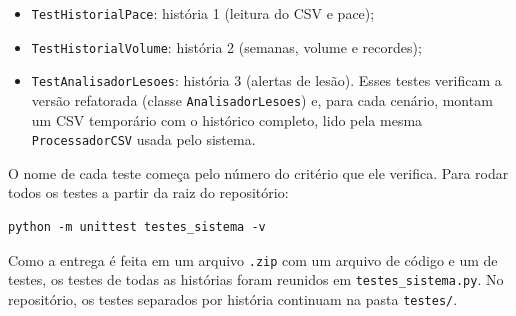 \documentclass[12pt,a4paper]{article}
\begin{document}
\begin{itemize}[itemsep=0.3em]
  \item \texttt{TestHistorialPace}: história 1 (leitura do CSV e pace);
  \item \texttt{TestHistorialVolume}: história 2 (semanas, volume e recordes);
  \item \texttt{TestAnalisadorLesoes}: história 3 (alertas de lesão). Esses testes
        verificam a versão refatorada (classe \texttt{AnalisadorLesoes}) e, para cada
        cenário, montam um CSV temporário com o histórico completo, lido pela mesma
        \texttt{ProcessadorCSV} usada pelo sistema.
\end{itemize}

O nome de cada teste começa pelo número do critério que ele verifica. Para rodar todos os
testes a partir da raiz do repositório:

\begin{verbatim}
python -m unittest testes_sistema -v
\end{verbatim}

Como a entrega é feita em um arquivo \texttt{.zip} com um arquivo de código e um de
testes, os testes de todas as histórias foram reunidos em \texttt{testes\_sistema.py}.
No repositório, os testes separados por história continuam na pasta \texttt{testes/}.
\end{document}
